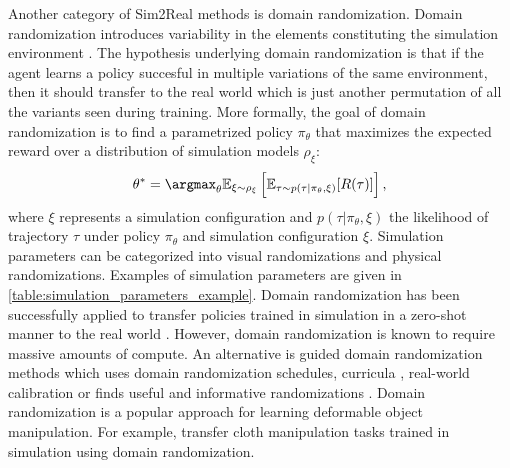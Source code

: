 \documentclass[\home/main.tex]{subfiles}
\begin{document}
Another category of Sim2Real methods is domain randomization. Domain randomization introduces variability in the elements constituting the simulation environment \autocite{tobin2017domain}. The hypothesis underlying domain randomization is that if the agent learns a policy succesful in multiple variations of the same environment, then it should transfer to the real world which is just another permutation of all the variants seen during training. More formally, the goal of domain randomization is to find a parametrized policy $\pi_{\theta}$ that maximizes the expected reward over a distribution of simulation models $\rho_{\xi}$:
\begin{equation}
	\theta^{*}=\argmax_{\theta} \mathbb{E}_{\xi \sim \rho_{\xi}}\left[\mathbb{E}_{\tau \sim p(\tau | \pi_{\theta}, \xi)}[R(\tau)]\right],
\end{equation}
where $\xi$ represents a simulation configuration and $p(\tau | \pi_{\theta}, \xi)$ the likelihood of trajectory $\tau$ under policy $\pi_{\theta}$ and simulation configuration $\xi$. Simulation parameters can be categorized into visual randomizations and physical randomizations. Examples of simulation parameters are given in \cref{table:simulation_parameters_example}. 
Domain randomization has been successfully applied to transfer policies trained in simulation in a zero-shot manner to the real world \autocite{tobin2017domain, Peng2018, openai2019solving}. However, domain randomization is known to require massive amounts of compute. An alternative is guided domain randomization methods which uses domain randomization schedules, curricula \autocite{raparthy2020generating}, real-world calibration \autocite{chebotar2019closing} or finds useful and informative randomizations \autocite{adr2019}. Domain randomization is a popular approach for learning deformable object manipulation. For example, \autocite{Matas2018, wu2020learning} transfer cloth manipulation tasks trained in simulation using domain randomization. 
\end{document}
